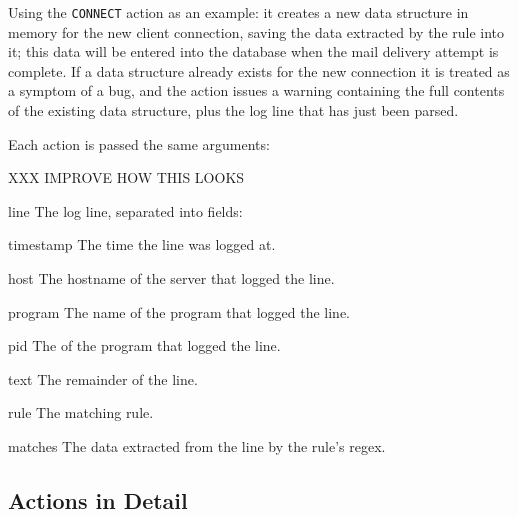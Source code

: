 Using the \texttt{CONNECT} action as an example: it creates a new data
structure in memory for the new client connection, saving the data
extracted by the rule into it; this data will be entered into the database
when the mail delivery attempt is complete.  If a data structure already
exists for the new connection it is treated as a symptom of a bug, and the
action issues a warning containing the full contents of the existing data
structure, plus the log line that has just been parsed.

Each action is passed the same arguments:


XXX IMPROVE HOW THIS LOOKS

\begin{eqlist}

    \item [line] The log line, separated into fields:

        \begin{eqlist}

            \item [timestamp] The time the line was logged at.

            \item [host] The hostname of the server that logged the line.

            \item [program] The name of the program that logged the line.

            \item [pid] The  of the program that logged the
                line.

            \item [text] The remainder of the line.

        \end{eqlist}

    \item [rule] The matching rule.

    \item [matches] The data extracted from the line by the rule's regex.

\end{eqlist}


\subsection{Actions in Detail}

